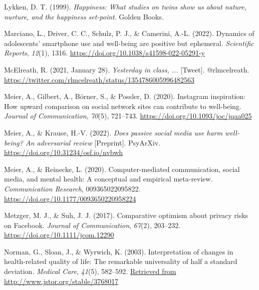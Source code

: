\documentclass[
  man,mask]{apa7}
\newlength{\cslhangindent}
\newlength{\cslentryspacingunit} %
\newenvironment{CSLReferences}[2] %
 {%
  \setlength{\parindent}{0pt}
  \ifodd #1
  \let\oldpar\par
  \def\par{\hangindent=\cslhangindent\oldpar}
  \fi
  \setlength{\parskip}{#2\cslentryspacingunit}
 }%
 {}
\begin{document}
\begin{CSLReferences}{1}{0}
\leavevmode{}%
Lykken, D. T. (1999). \emph{Happiness: {What} studies on twins show us about nature, nurture, and the happiness set-point}. {Golden Books}.

\leavevmode{}%
Marciano, L., Driver, C. C., Schulz, P. J., \& Camerini, A.-L. (2022). Dynamics of adolescents' smartphone use and well-being are positive but ephemeral. \emph{Scientific Reports}, \emph{12}(1), 1316. \url{https://doi.org/10.1038/s41598-022-05291-y}

\leavevmode{}%
McElreath, R. (2021, January 28). \emph{Yesterday in class, ...} {[}Tweet{]}. {@rlmcelreath}. \url{https://twitter.com/rlmcelreath/status/1354786005996482563}

\leavevmode{}%
Meier, A., Gilbert, A., Börner, S., \& Possler, D. (2020). Instagram inspiration: {How} upward comparison on social network sites can contribute to well-being. \emph{Journal of Communication}, \emph{70}(5), 721--743. \url{https://doi.org/10.1093/joc/jqaa025}

\leavevmode{}%
Meier, A., \& Krause, H.-V. (2022). \emph{Does passive social media use harm well-being? {An} adversarial review} {[}Preprint{]}. {PsyArXiv}. \url{https://doi.org/10.31234/osf.io/nvbwh}

\leavevmode{}%
Meier, A., \& Reinecke, L. (2020). Computer-mediated communication, social media, and mental health: {A} conceptual and empirical meta-review. \emph{Communication Research}, 009365022095822. \url{https://doi.org/10.1177/0093650220958224}

\leavevmode{}%
Metzger, M. J., \& Suh, J. J. (2017). Comparative optimism about privacy risks on {Facebook}. \emph{Journal of Communication}, \emph{67}(2), 203--232. \url{https://doi.org/10.1111/jcom.12290}

\leavevmode{}%
Norman, G., Sloan, J., \& Wyrwich, K. (2003). Interpretation of changes in health-related quality of life: {The} remarkable universality of half a standard deviation. \emph{Medical Care}, \emph{41}(5), 582--592. \href{Retrieved\%20from\%20http://www.jstor.org/stable/3768017}{Retrieved from http://www.jstor.org/stable/3768017}


\end{CSLReferences}
\end{document}
